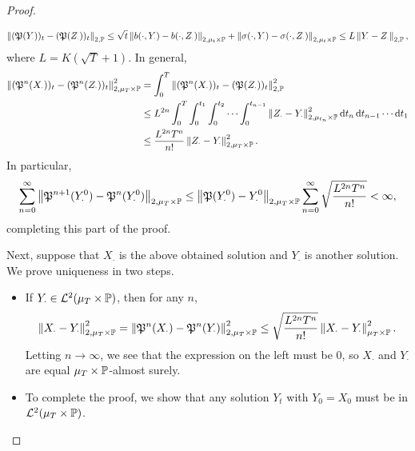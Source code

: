 \begin{proof}
\begin{itemize}
			\[ \left\lVert(\mathfrak{P}(Y_\cdot))_t - (\mathfrak{P}(Z_\cdot))_t\right\rVert_{2,\mathbb{P}} \leq \sqrt{t}\left\lVert b(\cdot,Y_\cdot)-b(\cdot,Z_\cdot)\right\rVert_{2,\mu_t\times\mathbb{P}} + \left\lVert\sigma(\cdot,Y_\cdot)-\sigma(\cdot,Z_\cdot)\right\rVert_{2,\mu_t\times\mathbb{P}} \leq L\left\lVert Y_\cdot - Z_\cdot\right\rVert_{2,\mathbb{P}}, \]
			where $L = K(\sqrt{T}+1)$. In general,
			\begin{align*}
				\left\lVert(\mathfrak{P}^n(X_\cdot))_t - (\mathfrak{P}^n(Z_\cdot))_t\right\rVert^2_{2,\mu_T\times\mathbb{P}} &= \int_0^T \left\lVert(\mathfrak{P}^n(X_\cdot))_t - (\mathfrak{P}(Z_\cdot))_t\right\rVert^2_{2,\mathbb{P}} \\
					&\leq L^{2n} \int_0^T \int_0^{t_1} \int_0^{t_2} \cdots \int_0^{t_{n-1}} \left\lVert Z_\cdot-Y_\cdot\right\rVert^2_{2,\mu_{t_n}\times\mathbb{P}}\operatorname{d}\!{t}_n\operatorname{d}\!{t}_{n-1}\cdots\operatorname{d}\!{t}_1 \\
					&\leq \frac{L^{2n}T^n}{n!}\left\lVert Z_\cdot-Y_\cdot\right\rVert^2_{2,\mu_T\times\mathbb{P}}.
			\end{align*}
			In particular,
			\[ \sum_{n=0}^\infty \left\lVert\mathfrak{P}^{n+1}(Y^0_\cdot) - \mathfrak{P}^n(Y^0_\cdot)\right\rVert_{2,\mu_T\times\mathbb{P}} \leq \left\lVert\mathfrak{P}(Y^0_\cdot) - Y^0_\cdot\right\rVert_{2,\mu_T\times\mathbb{P}} \sum_{n=0}^\infty \sqrt{\frac{L^{2n}T^n}{n!}} < \infty, \]
			completing this part of the proof.
	\end{itemize}
	Next, suppose that $X_\cdot$ is the above obtained solution and $Y_\cdot$ is another solution. We prove uniqueness in two steps.
	\begin{itemize}
		\item If $Y_\cdot\in\mathcal{L}^2(\mu_T\times\mathbb{P})$, then for any $n$,
		\[ \left\lVert X_\cdot - Y_\cdot\right\rVert^2_{2,\mu_T\times\mathbb{P}} = \left\lVert\mathfrak{P}^n(X_\cdot) - \mathfrak{P}^n(Y_\cdot)\right\rVert^2_{2,\mu_T\times\mathbb{P}} \leq \sqrt{\frac{L^{2n}T^n}{n!}} \left\lVert X_\cdot - Y_\cdot\right\rVert^2_{\mu_T\times\mathbb{P}}. \]
		Letting $n\to\infty$, we see that the expression on the left must be $0$, so $X_\cdot$ and $Y_\cdot$ are equal $\mu_T\times\mathbb{P}$-almost surely.
		\item To complete the proof, we show that any solution $Y_t$ with $Y_0 = X_0$ must be in $\mathcal{L}^2(\mu_T\times\mathbb{P})$.
	\end{itemize}
\end{proof}